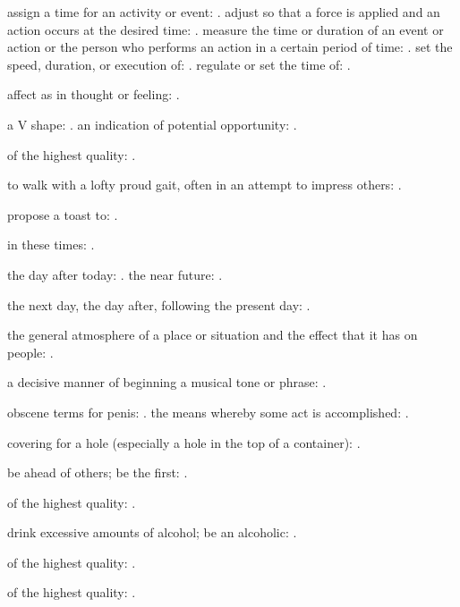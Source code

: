   assign a time for an activity or event: . adjust so that a force is applied and an action occurs at the desired time: . measure the time or duration of an event or action or the person who performs an action in a certain period of time: . set the speed, duration, or execution of: . regulate or set the time of: .

  affect as in thought or feeling: .

  a V shape: . an indication of potential opportunity: .

  of the highest quality: .

  to walk with a lofty proud gait, often in an attempt to impress others: .

  propose a toast to: .

  in these times: .

  the day after today: . the near future: .

  the next day, the day after, following the present day: .

  the general atmosphere of a place or situation and the effect that it has on people: .

  a decisive manner of beginning a musical tone or phrase: .

  obscene terms for penis: . the means whereby some act is accomplished: .

  covering for a hole (especially a hole in the top of a container): .

  be ahead of others; be the first: .

  of the highest quality: .

  drink excessive amounts of alcohol; be an alcoholic: .

  of the highest quality: .

  of the highest quality: .

